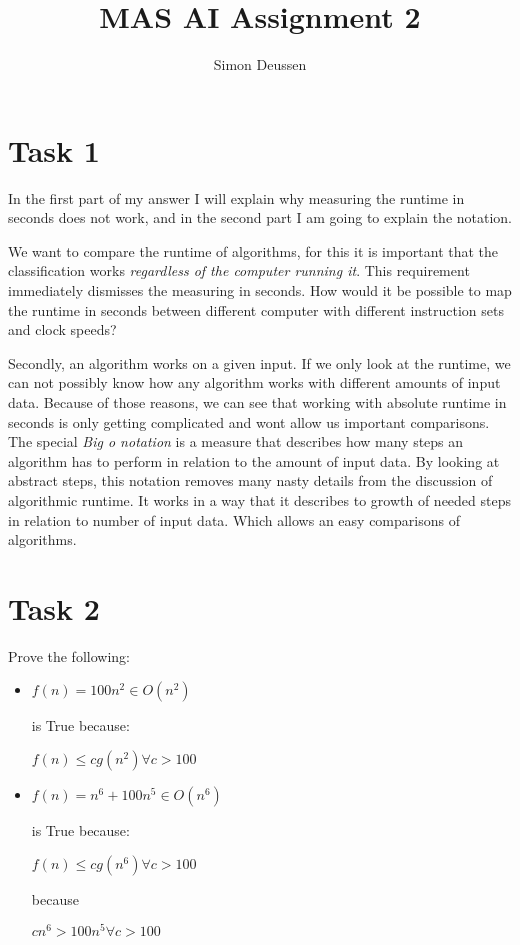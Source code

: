 \documentclass{article}
\title{MAS AI Assignment 2}
\author{Simon Deussen}
\begin{document}
\maketitle
{}

\section*{Task 1}
In the first part of my answer I will explain why measuring the runtime in seconds does not work,
  and in the second part I am going to explain the notation.

We want to compare the runtime of algorithms, for this it is important that the classification 
works \emph{regardless of the computer running it}. This requirement immediately dismisses the measuring
in seconds. How would it be possible to map the runtime in seconds between different computer with different
instruction sets and clock speeds? 

Secondly, an algorithm works on a given input. If we only look at the runtime, we can not possibly know how any 
algorithm works with different amounts of input data. Because of those reasons,
we can see that working with absolute runtime in seconds is only getting complicated and wont allow us important
comparisons. 
\\

The special \emph{Big o notation} is a measure that describes how many steps an algorithm has to perform
in relation to the amount of input data. By looking at abstract steps, this notation removes many nasty 
details from the discussion of algorithmic runtime. It works in a way that it describes to growth
of needed steps in relation to number of input data. Which allows an easy comparisons of algorithms.

\section*{Task 2}

Prove the following:
\begin{itemize}
  \item 
  $f(n) = 100n^2 \in O(n^2)$ 
  
  is True because: 
  
  $f(n) \le  c g(n^2) \forall c > 100$
  \item 
  $f(n) = n^6 + 100n^5 \in O(n^6) $ 
  
  is True because: 
  
  $f(n) \le  c g(n^6) \forall c > 100$
  
  because

  $cn^6 > 100n^5 \forall c > 100$
\end{itemize}
\end{document}
